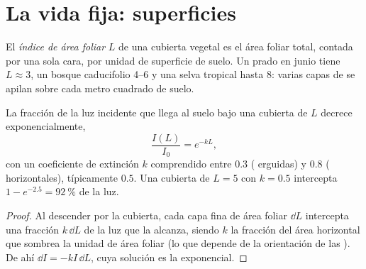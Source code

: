 \section{La vida fija: superficies}

\begin{definition}\label{def:b1:flowering-plant-organization:lai}
El \emph{índice de área foliar} $L$ de una
cubierta vegetal es el área foliar total, contada por una sola cara, por
unidad de superficie de suelo. Un prado en junio tiene $L \approx 3$, un
bosque caducifolio \qtyrange{4}{6}{} y una selva tropical hasta \qty{8}{}:
varias capas de  se apilan sobre cada metro cuadrado de suelo.
\end{definition}

\begin{proposition}\label{prop:b1:flowering-plant-organization:beer}
La fracción de la luz incidente que llega al suelo bajo una cubierta de
 $L$ decrece exponencialmente,
\[
\frac{I(L)}{I_0} = e^{-kL},
\]
con un coeficiente de extinción $k$ comprendido entre $0.3$ (
erguidas) y $0.8$ ( horizontales), típicamente $0.5$. Una cubierta de
$L = 5$ con $k = 0.5$ intercepta $1 - e^{-2.5} = \qty{92}{\%}$ de la luz.
\end{proposition}
\begin{proof}
Al descender por la cubierta, cada capa fina de área foliar $\dd L$
intercepta una fracción $k\,\dd L$ de la luz que la alcanza, siendo $k$ la
fracción del área horizontal que sombrea la unidad de área foliar (lo que
depende de la orientación de las ). De ahí $\dd I = -kI\,\dd L$, cuya
solución es la exponencial.
\end{proof}

